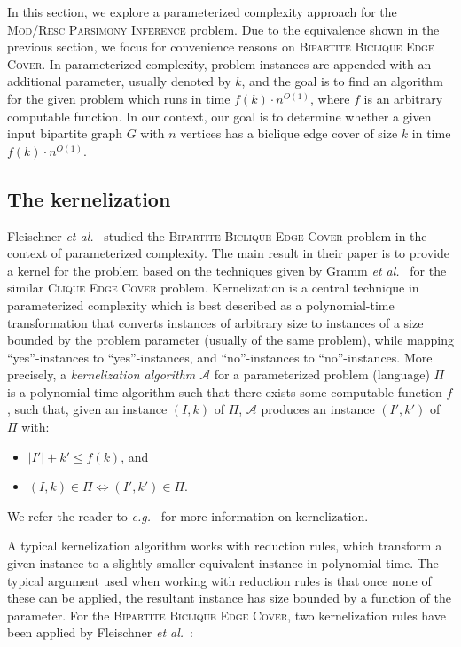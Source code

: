 

In this section, we explore a parameterized complexity approach
\cite{DowneyFellows1999,FlumGrohe2006,Niedermeier2006} for the
\textsc{Mod/Resc Parsimony Inference} problem. Due to the equivalence shown in the previous section, we focus
for convenience reasons on \textsc{Bipartite Biclique Edge
Cover}. In parameterized
complexity, problem instances are appended with an additional
parameter, usually denoted by $k$, and the goal is to find an
algorithm for the given problem which runs
in time $f(k) \cdot n^{O(1)}$, where $f$ is an arbitrary
computable function. In our context, our goal is to determine
whether a given input bipartite graph $G$ with $n$ vertices
has a biclique edge cover of size $k$ in time $f(k) \cdot
n^{O(1)}$.

\subsection{The kernelization}\label{s:sskern}

Fleischner \emph{et
al.}~\cite{FleischnerMujuniPaulusmaSzeider2009} studied the
\textsc{Bipartite Biclique Edge Cover} problem in the context
of parameterized complexity. The main result in their paper is to
provide a kernel for the problem based on the techniques given
by Gramm \emph{et al.}~\cite{GrammGuoHuffnerNiedermeier2006}
for the similar \textsc{Clique Edge Cover} problem.
Kernelization is a central technique in parameterized
complexity which is best described as a polynomial-time
transformation that converts instances of arbitrary size to
instances of a size bounded by the problem parameter (usually of
the same problem), while mapping ``yes''-instances to
``yes''-instances, and ``no''-instances to ``no''-instances. More
precisely, a \emph{kernelization algorithm} $\mathcal{A}$ for a
parameterized problem (language) $\Pi$ is a polynomial-time
algorithm such that there exists some computable function
$f$, such that, given an instance $(I,k)$ of $\Pi$, $\mathcal{A}$
produces an instance $(I',k')$ of $\Pi$ with:
\begin{itemize}
\item $|I'| + k' \leq f(k)$, and
\item $(I,k) \in \Pi \iff (I',k') \in \Pi$.
\end{itemize}

We refer the reader to
\emph{e.g.}~\cite{GuoNiedermeier2007,Niedermeier2006} for more
information on kernelization.

A typical kernelization algorithm works with reduction rules,
which transform a given instance to a slightly smaller
equivalent instance in polynomial time. The typical argument
used when working with reduction rules is that once none of
these can be applied, the resultant instance has size bounded
by a function of the parameter. For the \textsc{Bipartite
Biclique Edge Cover}, two kernelization rules have been applied
by Fleischner \emph{et
al.}~\cite{FleischnerMujuniPaulusmaSzeider2009}:\\


